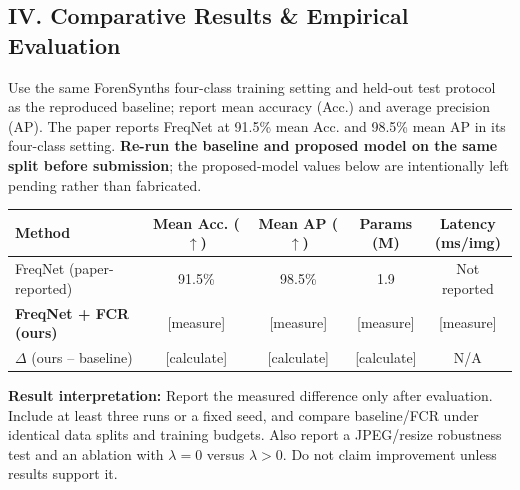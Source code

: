 \documentclass[8pt,a4paper]{article}
\begin{document}
\subsection*{IV. Comparative Results \& Empirical Evaluation}
Use the same ForenSynths four-class training setting and held-out test protocol as the reproduced baseline; report mean accuracy (Acc.) and average precision (AP). The paper reports FreqNet at 91.5\% mean Acc. and 98.5\% mean AP in its four-class setting. \textbf{Re-run the baseline and proposed model on the same split before submission}; the proposed-model values below are intentionally left pending rather than fabricated.
\begin{center}
\small
\begin{tabularx}{\linewidth}{@{}X c c c c@{}}
\toprule
\textbf{Method} & \makecell{\textbf{Mean Acc.}\\($\uparrow$)} & \makecell{\textbf{Mean AP}\\($\uparrow$)} & \makecell{\textbf{Params}\\(M)} & \makecell{\textbf{Latency}\\(ms/img)}\\
\midrule
FreqNet (paper-reported) & 91.5\% & 98.5\% & 1.9 & Not reported\\
\textbf{FreqNet + FCR (ours)} & [measure] & [measure] & [measure] & [measure]\\
\midrule
$\Delta$ (ours -- baseline) & [calculate] & [calculate] & [calculate] & N/A\\
\bottomrule
\end{tabularx}
\end{center}
\vspace{-5pt}
\textbf{Result interpretation:} Report the measured difference only after evaluation. Include at least three runs or a fixed seed, and compare baseline/FCR under identical data splits and training budgets. Also report a JPEG/resize robustness test and an ablation with $\lambda=0$ versus $\lambda>0$. Do not claim improvement unless results support it.
\end{document}
